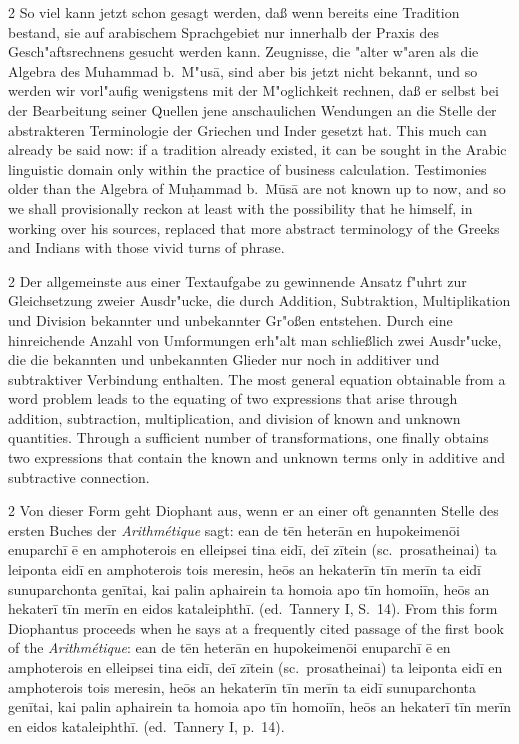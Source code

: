 \documentclass[10pt,a4paper]{article}
\renewcommand{\switchcolumn}{\syncronize\nointerlineskip\columnbreak}
\newcommand{\begingreek}{\bgroup\greekfont}
\newcommand{\closegreek}{\egroup}
\begin{document}
\begin{paracol}{2}
So viel kann jetzt schon gesagt werden, da\ss{} wenn bereits eine Tradition bestand, sie auf arabischem Sprachgebiet nur innerhalb der Praxis des Gesch"aftsrechnens gesucht werden kann. Zeugnisse, die "alter w"aren als die Algebra des Muhammad b.\ M"us\=a, sind aber bis jetzt nicht bekannt, und so werden wir vorl"aufig wenigstens mit der M"oglichkeit rechnen, da\ss{} er selbst bei der Bearbeitung seiner Quellen jene anschaulichen Wendungen an die Stelle der abstrakteren Terminologie der Griechen und Inder gesetzt hat.
\switchcolumn
This much can already be said now: if a tradition already existed, it can be sought in the Arabic linguistic domain only within the practice of business calculation. Testimonies older than the Algebra of Mu\d{h}ammad b.\ M\=us\=a are not known up to now, and so we shall provisionally reckon at least with the possibility that he himself, in working over his sources, replaced that more abstract terminology of the Greeks and Indians with those vivid turns of phrase.
\end{paracol}

\begin{paracol}{2}
Der allgemeinste aus einer Textaufgabe zu gewinnende Ansatz f"uhrt zur Gleichsetzung zweier Ausdr"ucke, die durch Addition, Subtraktion, Multiplikation und Division bekannter und unbekannter Gr"o\ss{}en entstehen. Durch eine hinreichende Anzahl von Umformungen erh"alt man schlie\ss{}lich zwei Ausdr"ucke, die die bekannten und unbekannten Glieder nur noch in additiver und subtraktiver Verbindung enthalten.
\switchcolumn
The most general equation obtainable from a word problem leads to the equating of two expressions that arise through addition, subtraction, multiplication, and division of known and unknown quantities. Through a sufficient number of transformations, one finally obtains two expressions that contain the known and unknown terms only in additive and subtractive connection.
\end{paracol}

\begin{paracol}{2}
Von dieser Form geht Diophant aus, wenn er an einer oft genannten Stelle des ersten Buches der \textit{Arithm\'etique} sagt: \begingreek ean de t\=en heter\=an en hupokeimen\=oi enuparch\=i \=e en amphoterois en elleipsei tina eid\=i, de\=i z\=itein (sc.\ prosatheinai) ta leiponta eid\=i en amphoterois tois meresin, he\=os an hekater\=in t\=in mer\=in ta eid\=i sunuparchonta gen\=itai, kai palin aphairein ta homoia apo t\=in homoi\=in, he\=os an hekater\=i t\=in mer\=in en eidos kataleiphth\=i. \closegreek (ed.\ Tannery I, S.\ 14).
\switchcolumn
From this form Diophantus proceeds when he says at a frequently cited passage of the first book of the \textit{Arithm\'etique}: \begingreek ean de t\=en heter\=an en hupokeimen\=oi enuparch\=i \=e en amphoterois en elleipsei tina eid\=i, de\=i z\=itein (sc.\ prosatheinai) ta leiponta eid\=i en amphoterois tois meresin, he\=os an hekater\=in t\=in mer\=in ta eid\=i sunuparchonta gen\=itai, kai palin aphairein ta homoia apo t\=in homoi\=in, he\=os an hekater\=i t\=in mer\=in en eidos kataleiphth\=i. \closegreek (ed.\ Tannery I, p.\ 14).
\end{paracol}
\end{document}
